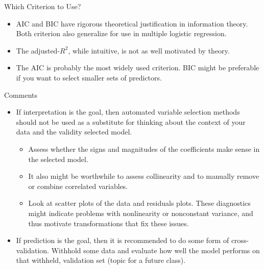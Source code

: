 \documentclass[10pt]{beamer}\usepackage[]{graphicx}\usepackage[]{color}
\begin{document}
\begin{frame}{Which Criterion to Use?}
\begin{itemize}
\item AIC and BIC have rigorous theoretical justification in information theory.  Both criterion also generalize for use in multiple logistic regression.
\vspace{10pt}
\item The adjusted-$R^2$, while intuitive, is not as well motivated by theory.
\vspace{10pt}
\item The AIC is probably the most widely used criterion.  BIC might be preferable if you want to select smaller sets of predictors.
\end{itemize}

\end{frame}
\begin{frame}{Comments}
\begin{itemize}
\item If interpretation is the goal, then automated variable selection methods should not be used as a substitute for thinking about the context of your data and the validity selected model. 
\vspace{5pt}
\begin{itemize}
\item Assess whether the signs and magnitudes of the coefficients make sense in the selected model.  
\item It also might be worthwhile to assess collinearity and to manually remove or combine correlated variables. 
\item Look at scatter plots of the data and residuals plots.  These diagnostics might indicate problems with nonlinearity or nonconstant variance, and thus motivate transformations that fix these issues.
\end{itemize}
\vspace{5pt}
\item If prediction is the goal, then it is recommended to do some form of cross-validation.  Withhold some data and evaluate how well the model performs on that withheld, validation set (topic for a future class).
\end{itemize}
\end{frame}
\end{document}
